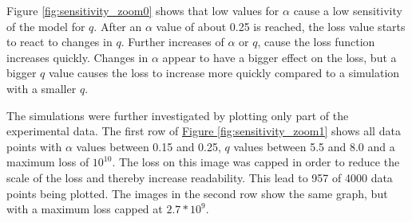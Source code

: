 Figure \ref*{fig:sensitivity_zoom0} shows that low values for $\alpha$ cause a low sensitivity of the model
for $q$. After an $\alpha$ value of about 0.25 is reached, the loss value starts to react to changes in $q$. Further
increases of $\alpha$ or $q$, cause the loss function increases quickly. Changes in $\alpha$ appear to have a bigger effect
on the loss, but a bigger $q$ value causes the loss to increase more quickly compared to a simulation with a smaller $q$.\newline

The simulations were further investigated by plotting only part of the experimental data.
The first row of \hyperref[fig:sensitivity_zoom1]{Figure \ref*{fig:sensitivity_zoom1}} shows all data points with $\alpha$ values between 0.15
and 0.25, $q$ values between 5.5 and 8.0 and a maximum loss of $10^{10}$. The loss on this image was capped in order to reduce
the scale of the loss and thereby increase readability. This lead to 957 of 4000 data points being plotted. The images in the
second row show the same graph, but with a maximum loss capped at $2.7*10^{9}$.

